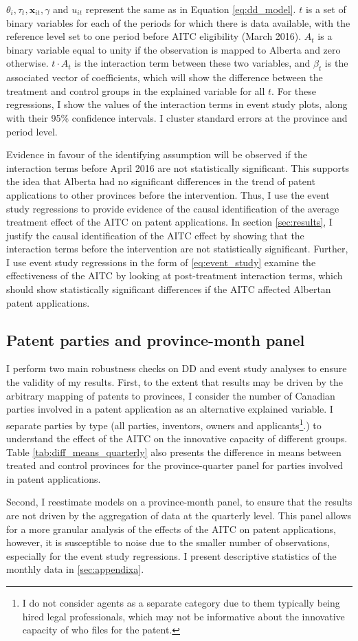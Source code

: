 \documentclass[../main.tex]{subfiles}
\begin{document}
$\theta_i, \tau_t, \mathbf{x}_{it}, \gamma$ and $u_{it}$ represent the same as in Equation \ref{eq:dd_model}. $t$ is a set of binary variables for each of the periods for which there is data available, with the reference level set to one period before AITC eligibility (March 2016). $A_t$ is a binary variable equal to unity if the observation is mapped to Alberta and zero otherwise. $t\cdot A_t$ is the interaction term between these two variables, and $\beta_t$ is the associated vector of coefficients, which will show the difference between the treatment and control groups in the explained variable for all $t$. For these regressions, I show the values of the interaction terms in event study plots, along with their 95\% confidence intervals. I cluster standard errors at the province and period level.

Evidence in favour of the identifying assumption will be observed if the interaction terms before April 2016 are not statistically significant. This supports the idea that Alberta had no significant differences in the trend of patent applications to other provinces before the intervention. Thus, I use the event study regressions to provide evidence of the causal identification of the average treatment effect of the AITC on patent applications. In section \ref{sec:results}, I justify the causal identification of the AITC effect by showing that the interaction terms before the intervention are not statistically significant. Further, I use event study regressions in the form of \ref{eq:event_study} examine the effectiveness of the AITC by looking at post-treatment interaction terms, which should show statistically significant differences if the AITC affected Albertan patent applications.

\subsection{Patent parties and province-month panel}

I perform two main robustness checks on DD and event study analyses to ensure the validity of my results. First, to the extent that results may be driven by the arbitrary mapping of patents to provinces, I consider the number of Canadian parties involved in a patent application as an alternative explained variable. I separate parties by type (all parties, inventors, owners and applicants\footnote{I do not consider agents as a separate category due to them typically being hired legal professionals, which may not be informative about the innovative capacity of who files for the patent.}.) to understand the effect of the AITC on the innovative capacity of different groups. Table \ref{tab:diff_means_quarterly} also presents the difference in means between treated and control provinces for the province-quarter panel for parties involved in patent applications.

Second, I reestimate models on a province-month panel, to ensure that the results are not driven by the aggregation of data at the quarterly level. This panel allows for a more granular analysis of the effects of the AITC on patent applications, however, it is susceptible to noise due to the smaller number of observations, especially for the event study regressions. I present descriptive statistics of the monthly data in \ref{sec:appendixa}. 
\end{document}
